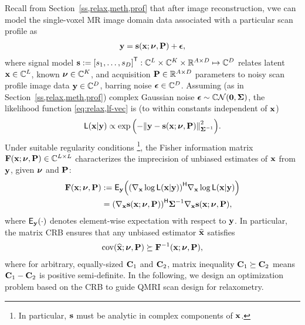 Recall from Section~\ref{ss,relax,meth,prof}
that after image reconstruction,
vwe can model the single-voxel MR image domain data
associated with a particular scan profile as 
\begin{align}
	\bmy = \bms\paren{\bmx; \bmnu, \bmP} + \bmeps,
	\label{eq:scn-dsgn,mod-vec-abbrev}
\end{align}
where signal model
$\bms := \brac{s_1, \dots, s_D}\tpose
: \complexes{L} \times \complexes{K} \times \reals{A \times D} \mapsto \complexes{D}$
relates latent $\mathbf{x} \in \mathbb{C}^{L}$,
known $\boldsymbol{\nu} \in \mathbb{C}^{K}$,
and acquisition $\mathbf{P} \in \mathbb{R}^{A \times D}$ parameters
to noisy scan profile image data $\mathbf{y} \in \mathbb{C}^{D}$, 
barring noise $\boldsymbol{\epsilon} \in \mathbb{C}^{D}$.
Assuming (as in Section~\ref{ss,relax,meth,prof})
complex Gaussian noise $\bmeps \sim \cgauss{\mathbf{0}}{\bmSig}$,
the likelihood function \eqref{eq:relax,lf-vec} is
(to within constants independent of $\mathbf{x}$)
\begin{align}
	\Lf{\bmx|\bmy} \propto
		\expa{-\norm{\bmy - \bms\paren{\bmx; \bmnu, \bmP}}^2_{\bmSig^{-1}}}.
	\label{eq:scn-dsgn,lf-vec}
\end{align}
Under suitable regularity conditions
\footnote{In particular,
$\mathbf{s}$ must be analytic in complex components
of $\mathbf{x}$.},
the Fisher information matrix 
$\Fisher{\bmx; \bmnu, \bmP} \in \complexes{L \times L}$
\cite{fisher:1925:tos}
characterizes the imprecision 
of unbiased estimates 
of $\mathbf{x}$ from $\mathbf{y}$, 
given $\boldsymbol{\nu}$ and $\mathbf{P}$:
\begin{align}
	\Fisher{\bmx; \bmnu, \bmP} 
		&:= 
		\expect{\bmy}{\paren{\grada{\bmx} \log{\Lf{\bmx|\bmy}}}\ctpose
		\grada{\bmx} \log{\Lf{\bmx|\bmy}}} 
		\nonumber \\
		&= 
		\paren{\grada{\bmx} \bms\paren{\bmx; \bmnu, \bmP}}\ctpose
		\bmSig^{-1} \grada{\bmx} \bms\paren{\bmx; \bmnu, \bmP}
		\label{eq:scn-dsgn,fisher},
\end{align}
where $\expect{\bmy}{\cdot}$ denotes element-wise expectation
with respect to $\mathbf{y}$.
In particular,
the matrix CRB \cite{cramer:46} ensures
that any unbiased estimator $\widehat{\mathbf{x}}$ satisfies
\begin{align}
	\cov{\est{\bmx}; \bmnu, \bmP} \succeq
		\bmF^{-1}\paren{\bmx; \bmnu, \bmP},
		\label{eq:scn-dsgn,crb}
\end{align}
where for arbitrary, equally-sized $\mathbf{C}_{1}$ and $\mathbf{C}_{2}$,
matrix inequality $\mathbf{C}_{1} \succeq \mathbf{C}_{2}$ 
means $\mathbf{C}_{1}-\mathbf{C}_{2}$ is positive semi-definite.
In the following,
we design an optimization problem 
based on the CRB
to guide QMRI scan design 
for relaxometry.

